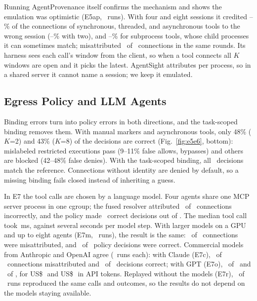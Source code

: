 Running AgentProvenance itself confirms the mechanism and shows the emulation was optimistic (E5ap, \APRuns\ runs). With four and eight sessions it credited \APWrongMin--\APWrongMax\% of the connections of synchronous, threaded, and asynchronous tools to the wrong session (\APWrongTwoMin--\APWrongTwoMax\% with two), and \APSubMin--\APSubMax\% for subprocess tools, whose child processes it can sometimes match; \solution{} misattributed \APFactWrong\ of \APFactConn\ connections in the same rounds. Its harness sees each call's window from the client, so when a tool connects all $K$ windows are open and it picks the latest. AgentSight attributes per process, so in a shared server it cannot name a session; we keep it emulated.

\subsection{Egress Policy and LLM Agents}
Binding errors turn into policy errors in both directions, and the task-scoped binding removes them. With manual markers and asynchronous tools, only 48\% ($K$=2) and 43\% ($K$=8) of the decisions are correct (Fig.~\ref{fig:e5e6}, bottom): mislabeled restricted executions pass (9--11\% false allows, \ie bypasses) and others are blocked (42--48\% false denies). With the task-scoped binding, all \ESixDecAuto\ decisions match the reference. Connections without identity are denied by default, so a missing binding fails closed instead of inheriting a guess.

In E7 the tool calls are chosen by a language model. Four agents share one MCP server process in one cgroup; the fused resolver attributed \ESevenWrong\ of \ESevenConn\ connections incorrectly, and the policy made \ESevenDecOK\ correct decisions out of \ESevenDec. The median tool call took \ESevenToolMs\,ms, against several seconds per model step. With larger models on a GPU and up to eight agents (E7m, \ESevenMRuns\ runs), the result is the same: \ESevenMWrong\ of \ESevenMConn\ connections were misattributed, and \ESevenMDecOK\ of \ESevenMDec\ policy decisions were correct. Commercial models from Anthropic and OpenAI agree (\ESevenCRuns\ runs each): with Claude (E7c), \ESevenCWrong\ of \ESevenCConn\ connections misattributed and \ESevenCDecOK\ of \ESevenCDec\ decisions correct; with GPT (E7o), \ESevenOWrong\ of \ESevenOConn\ and \ESevenODecOK\ of \ESevenODec, for US\$\,\ESevenCUSD\ and US\$\,\ESevenOUSD\ in API tokens. Replayed without the models (E7r), \ESevenRSame\ of \ESevenRRuns\ runs reproduced the same calls and outcomes, so the results do not depend on the models staying available.

